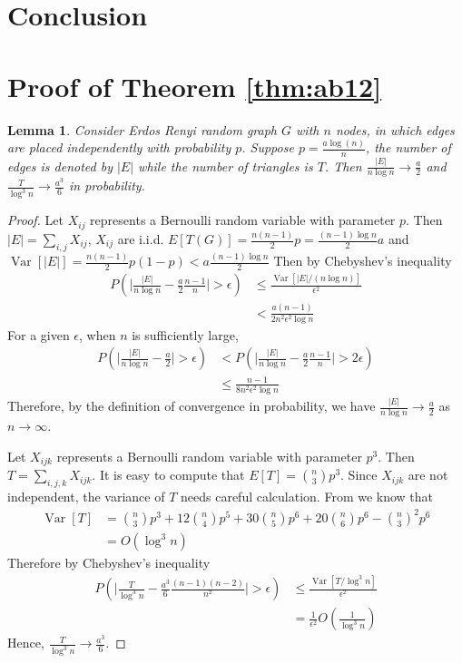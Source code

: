 \documentclass[journal]{IEEEtran}
\newtheorem{lemma}{Lemma}
\newcommand{\A}{\frac{a \log(n)}{n}}
\newcommand{\1}{\mathbbm{1}}
\DeclareMathOperator{\Var}{Var}
\begin{document}
\section{Conclusion}
\appendix
\section*{Proof of Theorem \ref{thm:ab12}}
\begin{lemma}\label{lem:ER_tr_counting}
	Consider Erdos Renyi random graph $G$ with $n$ nodes, in which edges are placed independently with probability $p$. Suppose
	$p=\A$, the number of edges is denoted by $|E|$ while the number of triangles is $T$. Then
	$\frac{|E|}{n \log n} \to \frac{a}{2}$ and $\frac{T}{\log^3 n} \to \frac{a^3}{6}$ in probability.
\end{lemma}
\begin{proof}
		Let $X_{ij}$ represents a Bernoulli random variable with parameter $p$. Then $|E| = \sum_{i,j} X_{ij}$, $X_{ij}$ are i.i.d.
	$E[T(G)] = \frac{n(n-1)}{2}p = \frac{(n-1)\log n}{2}a$ and $\Var[|E|] = \frac{n(n-1)}{2} p(1-p) < a\frac{(n-1)\log n}{2}$
	Then by Chebyshev's inequality
	\begin{align*}
	P(\Big|\frac{|E|}{n \log n } - \frac{a}{2} \frac{n-1}{n}\Big| > \epsilon) & \leq
	\frac{\Var[|E| /(n \log n )]}{\epsilon^2} \\
	& < \frac{a(n-1)}{2n^2\epsilon^2\log n}
	\end{align*}
	For a given $\epsilon$, when $n$ is sufficiently large,
	\begin{align*}
	P(\Big|\frac{|E|}{n \log n } - \frac{a}{2} \Big| > \epsilon) & <
	P(\Big|\frac{|E|}{n \log n } - \frac{a}{2} \frac{n-1}{n}\Big| > 2\epsilon) \\
	& \leq \frac{n-1}{8n^2 \epsilon^2 \log n}
	\end{align*}
	Therefore, by the definition of convergence in probability, we have $\frac{|E|}{n \log n} \to \frac{a}{2}$ as $n\to \infty$.
	
	Let $X_{ijk}$ represents a Bernoulli random variable with parameter $p^3$.
	Then $T = \sum_{i,j,k} X_{ijk}$.
	It is easy to compute that $E[T] = \binom{n}{3}p^3$. Since $X_{ijk}$ are not independent, the variance of $T$ needs careful calculation.
	From \cite{holland1977method} we know that
	\begin{align*}
	\Var[T] & = \binom{n}{3} p^3 + 12 \binom{n}{4} p^5 + 30 \binom{n}{5} p^6 + 20 \binom{n}{6} p^6 - \binom{n}{3}^2 p^6 \\
	 & = O(\log^3 n)
	\end{align*}
	Therefore
	by Chebyshev's inequality
	\begin{align*}
	P(\Big|\frac{T}{\log^3 n } - \frac{a^3}{6} \frac{(n-1)(n-2)}{n^2}\Big| > \epsilon) &\leq \frac{\Var[T /\log^3 n ]}{\epsilon^2} \\ 
	& = \frac{1}{\epsilon^2}O(\frac{1}{\log^3 n})
	\end{align*}
	Hence, $\frac{T}{\log^3 n} \to \frac{a^3}{6}$.
\end{proof}
\end{document}
